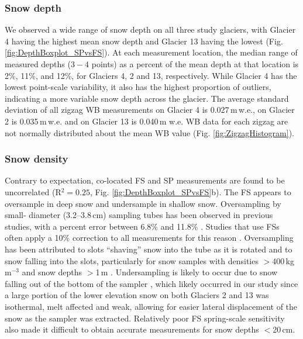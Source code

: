 \documentclass[twocolumn, letterpaper]{igs}
\begin{document}
\subsubsection{Snow depth}
We observed a wide range of snow depth on all three study glaciers, with Glacier 4 having the highest mean snow depth and Glacier 13 having the lowest (Fig. \ref{fig:DepthBoxplot_SPvsFS}). At each measurement location, the median range of measured depths ($3-4$ points) as a percent of the mean depth at that location is 2\%, 11\%, and 12\%, for Glaciers 4, 2 and 13, respectively. While Glacier 4 has the lowest point-scale variability, it also has the highest proportion of outliers, indicating a more variable snow depth across the glacier. The average standard deviation of all zigzag WB measurements on Glacier 4 is 0.027\,m\,w.e., on Glacier 2 is 0.035\,m\,w.e. and on Glacier 13 is 0.040\,m w.e. WB data for each zigzag are not normally distributed about the mean WB value (Fig. \ref{fig:ZigzagHistogram}).

\subsubsection{Snow density}

Contrary to expectation, co-located FS and SP measurements are found to be uncorrelated (R$^2=0.25$, Fig. \ref{fig:DepthBoxplot_SPvsFS}b). The FS appears to oversample in deep snow and undersample in shallow snow. Oversampling by small- diameter (3.2--3.8\,cm) sampling tubes has been observed in previous studies, with a percent error between 6.8\% and 11.8\% \citep[e.g.][]{Work1965, Fames1982, Conger2009}. Studies that use FSs often apply a 10\% correction to all measurements for this reason \citep[e.g.][]{Molotch2005}. Oversampling has been attributed to slots ``shaving'' snow into the tube as it is rotated \citep[e.g.][]{Dixon2012} and to snow falling into the slots, particularly for snow samples with densities $>$400\,kg\,m$^{-3}$ and snow depths $>$1\,m \citep[e.g.][]{Beaumont1963}. Undersampling is likely to occur due to snow falling out of the bottom of the sampler \citep{Turcan1975}, which likely occurred in our study since a large portion of the lower elevation snow on both Glaciers 2 and 13 was isothermal, melt affected and weak, allowing for easier lateral displacement of the snow as the sampler was extracted. Relatively poor FS spring-scale sensitivity also made it difficult to obtain accurate measurements for snow depths $<$20\,cm.
\end{document}
